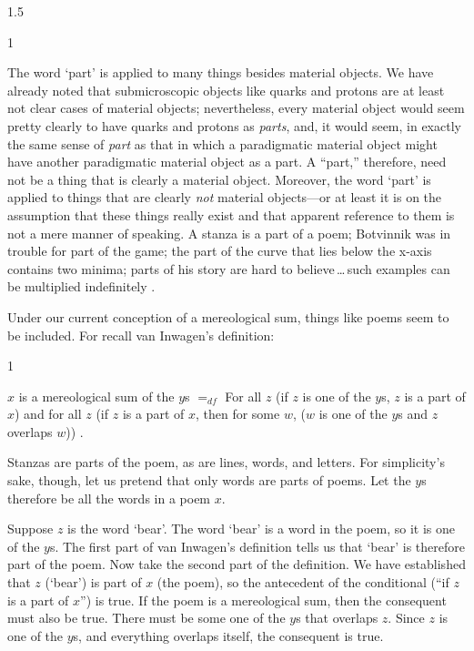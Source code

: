 \documentclass[11pt]{article}
\newenvironment{squote}{%
\begin{spacing}{1}
\begin{list}{}{%
\setlength{\labelwidth}{0pt}%
\rightmargin\leftmargin%
}
\item\relax
}{%
\end{list}%
\end{spacing}
}
\begin{document}
\begin{spacing}{1.5}
\begin{squote}
The word `part' is applied to many things besides material objects.
We have already noted that submicroscopic objects like quarks and
protons are at least not clear cases of material objects;
nevertheless, every material object would seem pretty clearly to have
quarks and protons as \emph{parts}, and, it would seem, in exactly the
same sense of \emph{part} as that in which a paradigmatic material
object might have another paradigmatic material object as a part.  A
``part,'' therefore, need not be a thing that is clearly a material
object.  Moreover, the word `part' is applied to things that are
clearly \emph{not} material objects---or at least it is on the
assumption that these things really exist and that apparent reference
to them is not a mere manner of speaking.  A stanza is a part of a
poem; Botvinnik was in trouble for part of the game; the part of the
curve that lies below the x-axis contains two minima; parts of his
story are hard to believe\,\ldots\,such examples can be multiplied
indefinitely \citeyearpar[18--19]{inwagen1995}.
\end{squote}

Under our current conception of a mereological sum, things like poems
seem to be included.  For recall van Inwagen's definition:

\begin{squote}
$x$ is a mereological sum of the $y$s $=_{df}$ For all $z$ (if $z$ is
  one of the $y$s, $z$ is a part of $x$) and for all $z$ (if $z$ is a
  part of $x$, then for some $w$, ($w$ is one of the $y$s and $z$
  overlaps $w$)) \citeyearpar[618--619]{inwagen2006}.
\end{squote}

Stanzas are parts of the poem, as are lines, words, and letters.  For
simplicity's sake, though, let us pretend that only words are parts of
poems.  Let the $y$s therefore be all the words in a poem $x$.

Suppose $z$ is the word `bear'.  The word `bear' is a word in the
poem, so it is one of the $y$s.  The first part of van Inwagen's
definition tells us that `bear' is therefore part of the poem.  Now
take the second part of the definition.  We have established that $z$
(`bear') is part of $x$ (the poem), so the antecedent of the
conditional (``if $z$ is a part of $x$'') is true.  If the poem is a
mereological sum, then the consequent must also be true.  There must
be some one of the $y$s that overlaps $z$.  Since $z$ is one of the
$y$s, and everything overlaps itself, the consequent is true.


\end{spacing}
\end{document}
